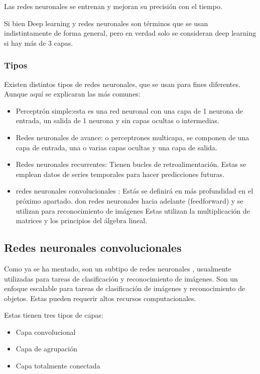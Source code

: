 Las redes neuronales se entrenan y mejoran su precisión con el tiempo.

Si bien Deep learning y redes neuronales son términos que se usan indistintamente de forma general, pero en verdad solo se consideran deep learning si hay más de 3 capas.

\subsubsection{Tipos}
Existen distintos tipos de redes neuronales, que se usan para fines diferentes. Aunque aquí se explicaran las más comunes:

\begin{itemize}
	\item{Perceptrón simple}:esta es una red neuronal con una capa de 1 neurona de entrada, un salida de 1 neurona y sin capas ocultas o intermedias.
	
	\item{Redes neuronales de avance}: o perceptrones multicapa, se componen de una capa de entrada, una o varias capas ocultas y una capa de salida.
	
	\item{Redes neuronales recurrentes}: Tienen bucles de retroalimentación. Estas se emplean datos de series temporales para hacer predicciones futuras.
	
	\item{redes neuronales convolucionales}	: Estás se definirá en más profundidad en el próximo apartado. don redes neuronales hacia adelante (feedforward) y se utilizan para reconocimiento de imágenes Estas utilizan la multiplicación de matrices y los principios del álgebra lineal.
\end{itemize}

\subsection{Redes neuronales convolucionales}\label{sect:redesConvolucionales}
Como ya se ha mentado, son un subtipo de redes neuronales \cite{ibmQuRedes}, usualmente utilizadas para tareas de clasificación y reconocimiento de imágenes. Son un enfoque escalable para tareas de clasificación de imágenes y reconocimiento de objetos. Estas pueden requerir altos recursos computacionales.

Estas tienen tres tipos de capas:
\begin{itemize}
	\item{Capa convolucional}
	
	\item{Capa de agrupación}
	
	\item{Capa totalmente conectada}	
\end{itemize}

